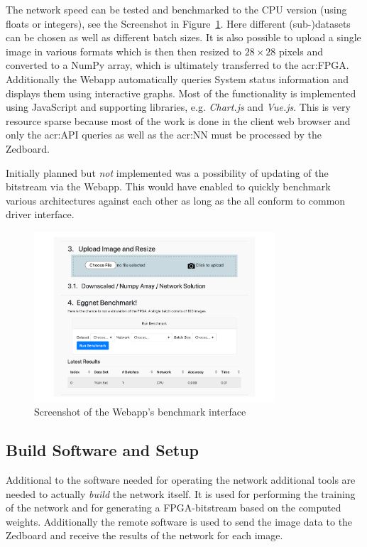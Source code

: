 The network speed can be tested and benchmarked to the CPU version (using floats or integers), see the Screenshot in Figure~\ref{fig:sw-webapp-bench}. Here different (sub-)datasets can be chosen as well as different batch sizes. It is also possible to upload a single image in various formats which is then then resized to $28 \times 28$ pixels and converted to a NumPy array, which is ultimately transferred to the \gls{acr:FPGA}. Additionally the Webapp automatically queries System status information and displays them using interactive graphs. Most of the functionality is implemented using JavaScript and supporting libraries, e.g. \emph{Chart.js} and \emph{Vue.js}. This is very resource sparse because most of the work is done in the client web browser and only the \gls{acr:API} queries as well as the \gls{acr:NN} must be processed by the Zedboard.

Initially planned but \emph{not} implemented was a possibility of updating of the bitstream via the Webapp. This would have enabled to quickly benchmark various architectures against each other as long as the all conform to common driver interface.

\begin{figure}[hbtp]
  \centering
  \includegraphics[width=0.8\textwidth]{img/webapp_bench}
  \caption{Screenshot of the Webapp's benchmark interface}
  \label{fig:sw-webapp-bench}
\end{figure}


\subsection{Build Software and Setup}

Additional to the software needed for operating the network additional tools are needed to actually \emph{build} the network itself. 
It is used for performing the training of the network and for generating a FPGA-bitstream based on the computed weights. Additionally the remote software is used to send the image data to the Zedboard and receive the results of the network for each image. 



